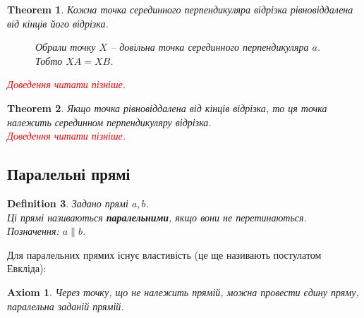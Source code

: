 \documentclass[a4paper, 10pt]{article}
\theoremstyle{theoremdd}
\newtheorem{theorem}{Theorem}[subsection]
\theoremstyle{theoremdd}
\newtheorem{axiom}{Axiom}
\theoremstyle{theoremdd}
\newtheorem{definition}[theorem]{Definition}
\theoremstyle{theoremdd}
\theoremstyle{theoremdd}
\theoremstyle{theoremdd}
\theoremstyle{theoremdd}
\theoremstyle{theoremdd}
\theoremstyle{theoremdd}
\begin{document}
\begin{theorem}
\label{perpendicular_bisector_and_equal_segments}
Кожна точка серединного перпендикуляра відрізка рівновіддалена від кінців його відрізка.
\begin{figure}[H]
\centering
{}
\caption*{Обрали точку $X$ -- довільна точка серединного перпендикуляра $a$. Тобто $XA = XB$.}
\end{figure}
\textcolor{red}{\textit{Доведення читати пізніше.}}
\end{theorem}

\begin{theorem}
\label{point_in_perpendicular_bisector_theorem}
Якщо точка рівновіддалена від кінців відрізка, то ця точка належить серединном перпендикуляру відрізка.\\
\textcolor{red}{\textit{Доведення читати пізніше.}}
\end{theorem}

\subsection{Паралельні прямі}
\begin{definition}
Задано прямі $a,b$.\\
Ці прямі називаються \textbf{паралельними}, якщо вони не перетинаються.\\
Позначення: $a \parallel b$.
\begin{figure}[H]
\centering
{}
\end{figure}
\end{definition}

Для паралельних прямих існує властивість (це ще називають постулатом Евкліда):

\begin{axiom}
Через точку, що не належить прямій, можна провести єдину пряму, паралельна заданій прямій.
\end{axiom}
\end{document}
